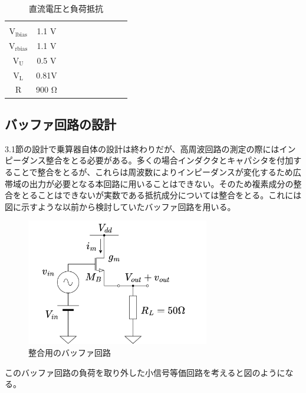 \documentclass[twocolumn]{jsarticle}
\begin{document}
        \begin{table}[H]
        \caption{直流電圧と負荷抵抗}
        \label{table:bias}
        \centering
        \begin{tabular}{c|ccccccccc}
            \multicolumn{2}{c}{} \\
            $\mathrm{V_{lbias}}$ & 1.1 V\\
            $\mathrm{V_{rbias}}$ & 1.1 V \\
            $\mathrm{V_{U}}$     & 0.5 V  \\
            $\mathrm{V_{L}}$     & 0.81V  \\
            $\mathrm{R}$         & 900 $\mathrm{\Omega}$  
        \end{tabular}
        \end{table}

    \subsection{バッファ回路の設計}
        3.1節の設計で乗算器自体の設計は終わりだが、高周波回路の測定の際にはインピーダンス整合をとる必要がある。多くの場合インダクタとキャパシタを付加することで整合をとるが、これらは周波数によりインピーダンスが変化するため広帯域の出力が必要となる本回路に用いることはできない。そのため複素成分の整合をとることはできないが実数である抵抗成分については整合をとる。これには図に示すような以前から検討していたバッファ回路を用いる。
        \begin{figure}[H]
            \begin{center}
                \includegraphics*[width = 80mm]{figures/resister_buf.png}
                \caption{整合用のバッファ回路}
                \label{fig:buf}
            \end{center}
        \end{figure}
        このバッファ回路の負荷を取り外した小信号等価回路を考えると図のようになる。
\end{document}
